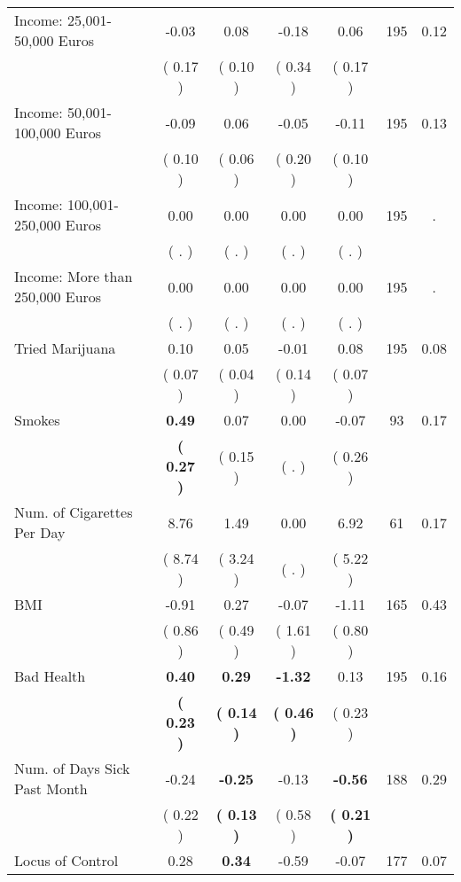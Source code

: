\begin{tabular}{lcccccc}
Income: 25,001-50,000 Euros &     -0.03 &      0.08 &     -0.18 &      0.06 & 195 &      0.12 \\ 
 & (     0.17 ) & (     0.10 ) & (     0.34 ) & (     0.17 ) & \\
Income: 50,001-100,000 Euros &     -0.09 &      0.06 &     -0.05 &     -0.11 & 195 &      0.13 \\ 
 & (     0.10 ) & (     0.06 ) & (     0.20 ) & (     0.10 ) & \\
Income: 100,001-250,000 Euros &      0.00 &      0.00 &      0.00 &      0.00 & 195 &         . \\ 
 & (        . ) & (        . ) & (        . ) & (        . ) & \\
Income: More than 250,000 Euros &      0.00 &      0.00 &      0.00 &      0.00 & 195 &         . \\ 
 & (        . ) & (        . ) & (        . ) & (        . ) & \\
Tried Marijuana &      0.10 &      0.05 &     -0.01 &      0.08 & 195 &      0.08 \\ 
 & (     0.07 ) & (     0.04 ) & (     0.14 ) & (     0.07 ) & \\
Smokes & \textbf{     0.49} &      0.07 &      0.00 &     -0.07 & 93 &      0.17 \\ 
 & \textbf{(     0.27 )} & (     0.15 ) & (        . ) & (     0.26 ) & \\
Num. of Cigarettes Per Day &      8.76 &      1.49 &      0.00 &      6.92 & 61 &      0.17 \\ 
 & (     8.74 ) & (     3.24 ) & (        . ) & (     5.22 ) & \\
BMI &     -0.91 &      0.27 &     -0.07 &     -1.11 & 165 &      0.43 \\ 
 & (     0.86 ) & (     0.49 ) & (     1.61 ) & (     0.80 ) & \\
Bad Health & \textbf{     0.40} & \textbf{     0.29} & \textbf{    -1.32} &      0.13 & 195 &      0.16 \\ 
 & \textbf{(     0.23 )} & \textbf{(     0.14 )} & \textbf{(     0.46 )} & (     0.23 ) & \\
Num. of Days Sick Past Month &     -0.24 & \textbf{    -0.25} &     -0.13 & \textbf{    -0.56} & 188 &      0.29 \\ 
 & (     0.22 ) & \textbf{(     0.13 )} & (     0.58 ) & \textbf{(     0.21 )} & \\
Locus of Control &      0.28 & \textbf{     0.34} &     -0.59 &     -0.07 & 177 &      0.07 \\ 

\end{tabular}
